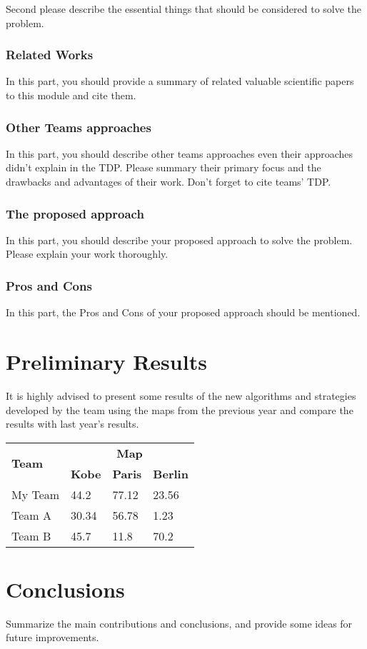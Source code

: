 \documentclass[runningheads,a4paper]{llncs}
\begin{document}
Second please describe the essential things that should be considered to solve the problem.
\subsubsection{Related Works}
In this part, you should provide a summary of related valuable scientific papers to this module and cite them.
\subsubsection{Other Teams approaches}
In this part, you should describe other teams approaches even their approaches didn't explain in the TDP. Please summary their primary focus and the drawbacks and advantages of their work. Don't forget to cite teams' TDP.
\subsubsection{The proposed approach}
In this part, you should describe your proposed approach to solve the problem. Please explain your work thoroughly.
\subsubsection{Pros and Cons}
In this part, the Pros and Cons of your proposed approach should be mentioned.

\section{Preliminary Results}
It is highly advised to present some results of the new algorithms and
strategies developed by the team using the maps from the previous year and
compare the results with last year's results.
\begin{table}
  \begin{tabular}{llll}
    \hline
    \multirow{2}{*}{\textbf{Team}}  & \multicolumn{3}{c}{\textbf{Map}}\\
    \cline{2-4}
                                    & \textbf{Kobe} & \textbf{Paris}  & \textbf{Berlin}\\
    \hline
    My Team                         & 44.2          & 77.12           & 23.56\\
    Team A                          & 30.34         & 56.78           & 1.23\\
    Team B                          & 45.7          & 11.8            & 70.2\\
    \hline
  \end{tabular}
\end{table}
\section{Conclusions}
Summarize the main contributions and conclusions, and provide some ideas for
future improvements.


\end{document}
